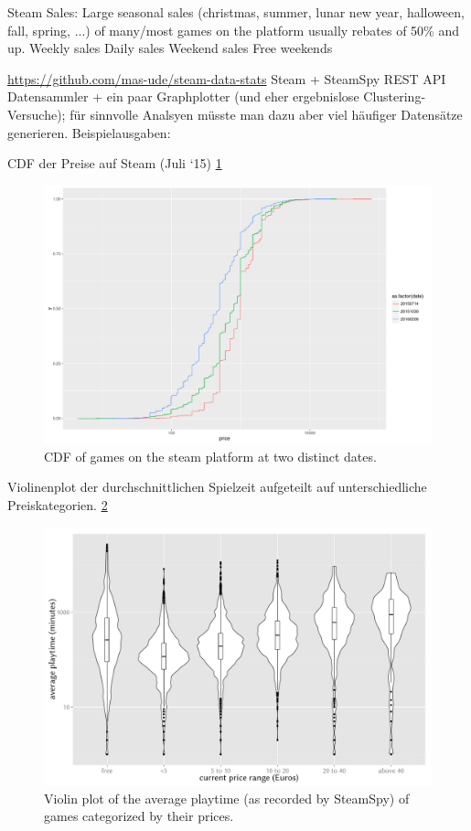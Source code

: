 Steam Sales:
Large seasonal sales (christmas, summer, lunar new year, halloween, fall, spring, ...) of many/most games on the platform usually rebates of 50\% and up.
Weekly sales
Daily sales
Weekend sales
Free weekends



\url{https://github.com/mas-ude/steam-data-stats} Steam + SteamSpy REST API Datensammler + ein paar Graphplotter (und eher ergebnislose Clustering-Versuche); für sinnvolle Analsyen müsste man dazu aber viel häufiger Datensätze generieren. Beispielausgaben:

CDF der Preise auf Steam (Juli ‘15) \ref{fig:steam-prices}

\begin{figure}[!t]
	\centering
	\includegraphics[width=1.0\columnwidth]{images/steam-prices.pdf}
	\caption{CDF of games on the steam platform at two distinct dates.}
\label{fig:steam-prices}
\end{figure}

Violinenplot der durchschnittlichen Spielzeit aufgeteilt auf unterschiedliche Preiskategorien. \ref{fig:steam-cost-vs-playtime-violin}

\begin{figure}[!t]
	\centering
	\includegraphics[width=1.0\columnwidth]{images/steam-cost-vs-playtime.pdf}
	\caption{Violin plot of the average playtime (as recorded by SteamSpy) of games categorized by their prices.}
\label{fig:steam-cost-vs-playtime-violin}
\end{figure}

